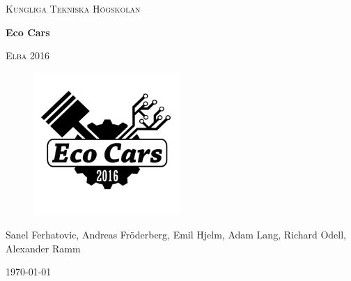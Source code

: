 \documentclass[a4paper, 12pt]{report}
\begin{document}

\begin{titlepage}
	\centering
	{\scshape Kungliga Tekniska Högskolan \par}
	\vspace{2cm}
    {\huge\bfseries Eco Cars\par}
	\vspace{0.5cm}
	{\scshape\Large Elba 2016\par}
	\vspace{1.5cm}
	\begin{figure}[H]
    \centering\label{fig:ECO}
    \includegraphics[width=0.5\textwidth]{./img/ECOCARS}
\end{figure}

    {\Large\itshape{Sanel Ferhatovic, Andreas Fröderberg, Emil Hjelm, Adam Lang,
    Richard Odell, Alexander Ramm \par}}
	\vfill
	\vfill

	{\large \today\par}
\end{titlepage}


\begin{abstract}
As the population on earth increases so does the emissions of greenhouse gases to the atmosphere. This has a huge impact on the environment on our planet and there are many incentives to break this trend. Since the automotive industry is one of the main culprits today, a lot of focus is on reducing the amount of emission from vehicles. Shell Eco Marathon is an international event where students are allowed to build vehicles and compete in fuel-efficiency.\\

\noindent
This report covers the work performed on project Elba and is written by six master students from KTH.\\

\noindent
A hybrid vehicle was upgraded and modified to run on ethanol. In addition an optimal speed trajectory controller were designed and implemented to minimize energy consumption.
A rolling highway, or a test rig, were designed and constructed to be able to test the cars performance on any, simulated, track's height-profile. 
The theoretical performance was evaluated, which estimated that the car would have a mileage of 197 km/litre ethanol if run on the competition track located in London.
\end{abstract}
\clearpage
\setcounter{page}{3}
\end{document}
